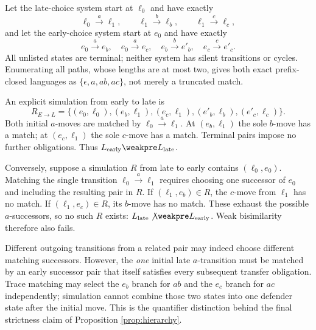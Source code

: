 \begin{example}\label{ex:branching}
Let the late-choice system start at $\ell_0$ and have exactly
\begin{equation}\label{eq:late-choice}
\ell_0\xrightarrow{a}\ell_1,\qquad
\ell_1\xrightarrow{b}\ell_b,\qquad \ell_1\xrightarrow{c}\ell_c,
\end{equation}
and let the early-choice system start at $e_0$ and have exactly
\begin{equation}\label{eq:early-choice}
e_0\xrightarrow{a}e_b,\quad e_0\xrightarrow{a}e_c,\quad
e_b\xrightarrow{b}e'_b,\quad e_c\xrightarrow{c}e'_c.
\end{equation}
All unlisted states are terminal; neither system has silent transitions or
cycles. Enumerating all paths, whose lengths are at most two, gives both exact
prefix-closed languages as $\{\epsilon,a,ab,ac\}$, not merely a truncated match.

An explicit simulation from early to late is
\begin{equation}\label{eq:early-late-witness}
R_{E\to L}=\{(e_0,\ell_0),(e_b,\ell_1),(e_c,\ell_1),
(e'_b,\ell_b),(e'_c,\ell_c)\}.
\end{equation}
Both initial $a$-moves are matched by $\ell_0\xrightarrow{a}\ell_1$.
At $(e_b,\ell_1)$ the sole $b$-move has a match; at $(e_c,\ell_1)$ the sole
$c$-move has a match. Terminal pairs impose no further obligations. Thus
$L_{\mathrm{early}}\weakpre L_{\mathrm{late}}$.

Conversely, suppose a simulation $R$ from late to early contains
$(\ell_0,e_0)$. Matching the single transition
$\ell_0\xrightarrow{a}\ell_1$ requires choosing one successor of $e_0$ and
including the resulting pair in $R$. If $(\ell_1,e_b)\in R$, the $c$-move
from $\ell_1$ has no match. If $(\ell_1,e_c)\in R$, its $b$-move has no
match. These exhaust the possible $a$-successors, so no such $R$ exists:
$L_{\mathrm{late}}\not\weakpre L_{\mathrm{early}}$. Weak bisimilarity
therefore also fails.

Different outgoing transitions from a related pair may indeed choose different
matching successors. However, the \emph{one} initial late $a$-transition must
be matched by an early successor pair that itself satisfies every subsequent
transfer obligation. Trace matching may select the $e_b$ branch for $ab$ and
the $e_c$ branch for $ac$ independently; simulation cannot combine those two
states into one defender state after the initial move. This is the quantifier
distinction behind the final strictness claim of Proposition
\ref{prop:hierarchy}.
\end{example}
